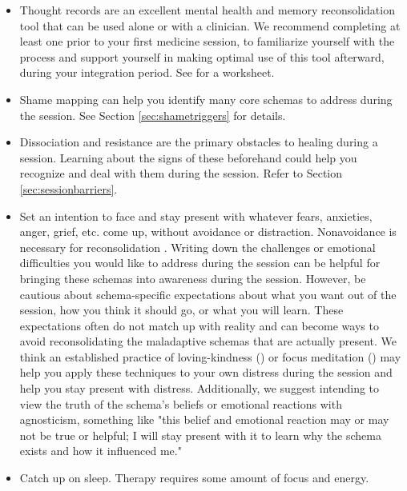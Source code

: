 \documentclass[12pt,letterpaper]{book}
\begin{document}
\begin{itemize}
    \item Thought records are an excellent mental health and memory reconsolidation tool that can be used alone or with a clinician. We recommend completing at least one prior to your first medicine session, to familiarize yourself with the process and support yourself in making optimal use of this tool afterward, during your integration period. See \textcite{harperThought} for a worksheet.
    \item Shame mapping can help you identify many core schemas to address during the session. See Section \ref{sec:shametriggers} for details.
    \item Dissociation and resistance are the primary obstacles to healing during a session. Learning about the signs of these beforehand could help you recognize and deal with them during the session. Refer to Section \ref{sec:sessionbarriers}.
    \item Set an intention to face and stay present with whatever fears, anxieties, anger, grief, etc. come up, without avoidance or distraction. Nonavoidance is necessary for reconsolidation \cite{eckerUnlocking}. Writing down the challenges or emotional difficulties you would like to address during the session can be helpful for bringing these schemas into awareness during the session. However, be cautious about schema-specific expectations about what you want out of the session, how you think it should go, or what you will learn. These expectations often do not match up with reality and can become ways to avoid reconsolidating the maladaptive schemas that are actually present. We think an established practice of loving-kindness (\textcite{lkMeditation}) or focus meditation (\textcite{rain}) may help you apply these techniques to your own distress during the session and help you stay present with distress. Additionally, we suggest intending to view the truth of the schema's beliefs or emotional reactions with agnosticism, something like "this belief and emotional reaction may or may not be true or helpful; I will stay present with it to learn why the schema exists and how it influenced me."
    \item Catch up on sleep. Therapy requires some amount of focus and energy.

\end{itemize}
\end{document}
